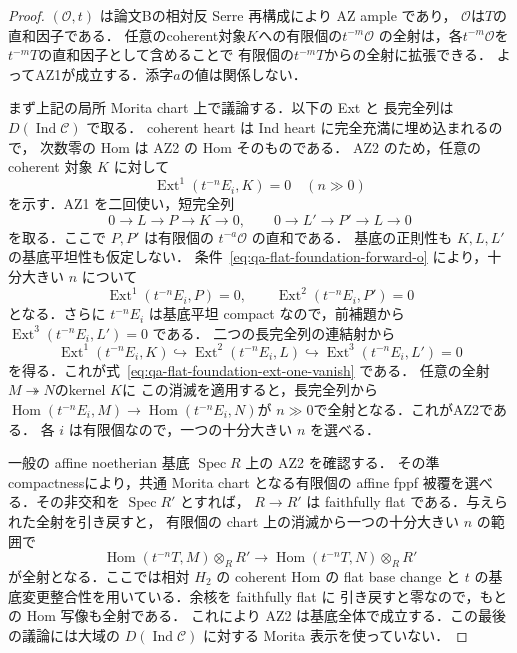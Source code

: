 \begin{proof}
$(\mathcal O,t)$ は論文Bの相対反 Serre 再構成により AZ ample であり，
$\mathcal O$は$T$の直和因子である．
任意のcoherent対象$K$への有限個の$t^{-m}\mathcal O$
の全射は，各$t^{-m}\mathcal O$を
$t^{-m}T$の直和因子として含めることで
有限個の$t^{-m}T$からの全射に拡張できる．
よってAZ1が成立する．添字$a$の値は関係しない．

まず上記の局所 Morita chart 上で議論する．以下の Ext と
長完全列は $D(\operatorname{Ind}\mathcal C)$ で取る．
coherent heart は Ind heart に完全充満に埋め込まれるので，
次数零の Hom は AZ2 の Hom そのものである．
AZ2 のため，任意の coherent 対象 $K$ に対して
\[
 \operatorname{Ext}^1(t^{-n}E_i,K)=0\quad(n\gg0)
 \tag{FV}\label{eq:qa-flat-foundation-ext-one-vanish}
\]
を示す．AZ1 を二回使い，短完全列
\[
 0\longrightarrow L\longrightarrow P\longrightarrow K\longrightarrow0,
 \qquad
 0\longrightarrow L'\longrightarrow P'\longrightarrow L\longrightarrow0
\]
を取る．ここで $P,P'$ は有限個の $t^{-a}\mathcal O$ の直和である．
基底の正則性も $K,L,L'$ の基底平坦性も仮定しない．
条件~\eqref{eq:qa-flat-foundation-forward-o} により，十分大きい $n$ について
\[
 \operatorname{Ext}^1(t^{-n}E_i,P)=0,
 \qquad \operatorname{Ext}^2(t^{-n}E_i,P')=0
\]
となる．さらに $t^{-n}E_i$ は基底平坦 compact なので，前補題から
$\operatorname{Ext}^3(t^{-n}E_i,L')=0$ である．
二つの長完全列の連結射から
\[
 \operatorname{Ext}^1(t^{-n}E_i,K)
  \hookrightarrow\operatorname{Ext}^2(t^{-n}E_i,L)
  \hookrightarrow\operatorname{Ext}^3(t^{-n}E_i,L')=0
\]
を得る．これが式~\eqref{eq:qa-flat-foundation-ext-one-vanish} である．
任意の全射$M\twoheadrightarrow N$のkernel $K$に
この消滅を適用すると，長完全列から
$\operatorname{Hom}(t^{-n}E_i,M)\to
\operatorname{Hom}(t^{-n}E_i,N)$が
$n\gg0$で全射となる．これがAZ2である．
各 $i$ は有限個なので，一つの十分大きい $n$ を選べる．

一般の affine noetherian 基底 $\operatorname{Spec}R$ 上の AZ2 を確認する．
その準compactnessにより，共通 Morita chart となる有限個の affine fppf
被覆を選べる．その非交和を $\operatorname{Spec}R'$ とすれば，
$R\to R'$ は faithfully flat である．与えられた全射を引き戻すと，
有限個の chart 上の消滅から一つの十分大きい $n$ の範囲で
\[
 \operatorname{Hom}(t^{-n}T,M)\otimes_R R'
 \longrightarrow
 \operatorname{Hom}(t^{-n}T,N)\otimes_R R'
\]
が全射となる．ここでは相対 $H_2$ の coherent Hom の flat base change
と $t$ の基底変更整合性を用いている．余核を faithfully flat に
引き戻すと零なので，もとの Hom 写像も全射である．
これにより AZ2 は基底全体で成立する．この最後の議論には大域の
$D(\operatorname{Ind}\mathcal C)$ に対する Morita 表示を使っていない．
\end{proof}

